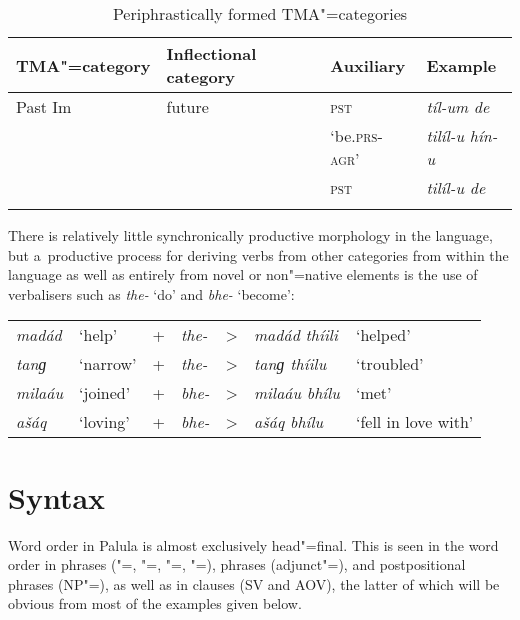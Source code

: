 \begin{table}[ht]
\caption{Periphrastically formed TMA"=categories}
\begin{tabularx}{\textwidth}{ l l Q Q }
\lsptoprule
TMA"=category &
Inflectional category &
Auxiliary &
Example \\\hline
Past Im &
future &
\textsc{pst} &
\textit{tíl-um de} \\
 &
 &
`be.\textsc{prs-agr}' &
\textit{tilíl-u hín-u} \\
 &
 &
\textsc{pst} &
\textit{tilíl-u de} \\\lspbottomrule
\end{tabularx}
\label{tab:2-peri}
\end{table}


There is relatively little synchronically productive  morphology in the language, but a~productive process for deriving verbs from other categories from within the language as well as entirely from novel or non"=native elements is the use of verbalisers such as \textit{the-} `do' and \textit{bhe-} `become':


\begin{table}[H]
\begin{tabularx}{\textwidth}{ l l l l l l l}
\textit{madád} &
`help' &
+ &
\textit{the-} &
{\textgreater} &
\textit{madád thíili} &
`helped'\\
\textit{tanɡ} &
`narrow' &
+ &
\textit{the-} &
{\textgreater} &
\textit{tanɡ thíilu} &
`troubled'\\
\textit{milaáu} &
`joined' &
+ &
\textit{bhe-} &
{\textgreater} &
\textit{milaáu bhílu} &
`met'\\
\textit{ašáq} &
`loving' &
+ &
\textit{bhe-} &
{\textgreater} &
\textit{ašáq bhílu} &
`fell in love with'\\
\end{tabularx}
\end{table}



\section{Syntax}
\label{sec:2-3}
Word order in Palula is almost exclusively head"=final. This is seen in the word order in  phrases ("=, "=, "=, "=),  phrases (adjunct"=), and postpositional phrases (NP"=), as well as in clauses (SV and AOV), the latter of which will be obvious from most of the examples given below.


